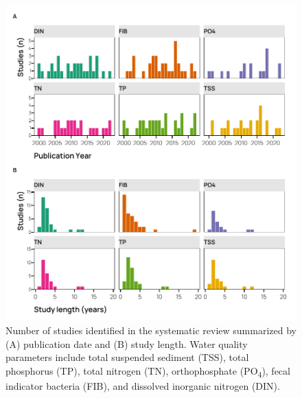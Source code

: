 \documentclass[utf8]{FrontiersinHarvard}
\begin{document}
\begin{figure}
\includegraphics[width=1\linewidth,]{../figures/bmp_temporal_summary} \caption{Number of studies identified in the systematic review summarized by (A) publication date and (B) study length. Water quality parameters include total suspended sediment (TSS), total phosphorus (TP), total nitrogen (TN), orthophosphate (PO\textsubscript{4}), fecal indicator bacteria (FIB), and dissolved inorganic nitrogen (DIN).}\label{fig:bmptemporal}
\end{figure}
\end{document}
